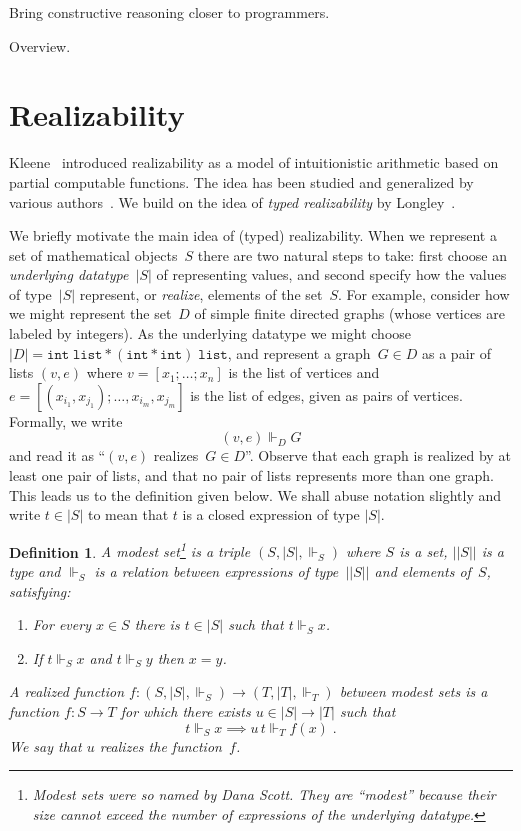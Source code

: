 \documentclass{article}
\newcommand{\ut}[1]{|#1|}
\newcommand{\rz}{\Vdash}
\newtheorem{definition}[theorem]{Definition}
\begin{document}
Bring constructive reasoning closer to programmers.

Overview.

\section{Realizability}
\label{sec:realizability}

Kleene~\cite{KleeneSC:intint} introduced realizability as a model of
intuitionistic arithmetic based on partial computable functions. The
idea has been studied and generalized by various
authors~\cite{TroelstraA:rea,HylandJ:efft,HylandJ:trit,OostenJ:exer}.
We build on the idea of \emph{typed realizability} by
Longley~\cite{Longley00}.

We briefly motivate the main idea of (typed) realizability. When we
represent a set of mathematical objects~$S$ there are two natural
steps to take: first choose an \emph{underlying datatype~$\ut{S}$} of
representing values, and second specify how the values of
type~$\ut{S}$ represent, or \emph{realize}, elements of the set~$S$.
For example, consider how we might represent the set~$D$ of simple
finite directed graphs (whose vertices are labeled by integers). As
the underlying datatype we might choose $\ut{D} = \mathtt{int} \;
\mathtt{list} * (\mathtt{int} * \mathtt{int}) \; \mathtt{list}$, and
represent a graph~$G \in D$ as a pair of lists $(v,e)$ where $v =
[x_1; \ldots; x_n]$ is the list of vertices and $e = [(x_{i_1},
x_{j_1}); \ldots, x_{i_m}, x_{j_m}]$ is the list of edges, given as
pairs of vertices. Formally, we write
%
\begin{equation*}
  (v, e) \rz_D G
\end{equation*}
%
and read it as ``$(v,e)$ realizes~$G \in D$''. Observe that each graph
is realized by at least one pair of lists, and that no pair of lists
represents more than one graph. This leads us to the definition given
below. We shall abuse notation slightly and write $t \in \ut{S}$ to
mean that $t$ is a closed expression of type $\ut{S}$.

\begin{definition}
  A \emph{modest set}\footnote{Modest sets were so named by Dana
    Scott. They are ``modest'' because their size cannot exceed the
    number of expressions of the underlying datatype.} is a triple
  $(S, \ut{S}, {\rz_S})$ where $S$ is a set, $\ut{|S|}$ is a type and
  $\rz_S$ is a relation between expressions of type~$\ut{|S|}$ and
  elements of~$S$, satisfying:
  \begin{enumerate}
  \item For every $x \in S$ there is $t \in \ut{S}$ such that $t \rz_S
    x$.
  \item If $t \rz_S x$ and $t \rz_S y$ then $x = y$.
  \end{enumerate}
  A \emph{realized function} $f : (S, \ut{S}, {\rz_S}) \to (T, \ut{T},
  {\rz_T})$ between modest sets is a function $f : S \to T$ for which
  there exists $u \in \ut{S} \to \ut{T}$ such that
  \begin{equation*}
    t \rz_S x \implies u\,t \rz_T f(x) \;.
  \end{equation*}
  We say that $u$ \emph{realizes} the function~$f$.
\end{definition}
\end{document}

